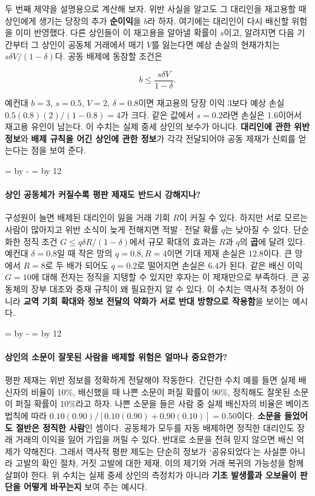 \documentclass[10pt,a4paper]{article}
\newcommand{\ReserveQuestionSpace}{%
  \par\begingroup
  \dimen0=\pagegoal \advance\dimen0 by -\pagetotal
  \dimen2=\baselineskip \multiply\dimen2 by 12
  \ifdim\dimen0<\dimen2 \newpage\fi
  \endgroup}
\begin{document}
두 번째 제약을 설명용으로 계산해 보자. 위반 사실을 알고도 그 대리인을 재고용할 때 상인에게 생기는 당장의 추가 \textbf{순이익}을 $b$라 하자. 여기에는 대리인이 다시 배신할 위험을 이미 반영했다. 다른 상인들이 이 재고용을 알아낼 확률이 $s$이고, 알려지면 다음 기간부터 그 상인이 공동체 거래에서 매기 $V$를 잃는다면 예상 손실의 현재가치는 $s\delta V/(1-\delta)$다. 공동 배제에 동참할 조건은\par

\[
b\leq\frac{s\delta V}{1-\delta}.
\]

예컨대 $b=3$, $s=0.5$, $V=2$, $\delta=0.8$이면 재고용의 당장 이익 3보다 예상 손실 $0.5(0.8)(2)/(1-0.8)=4$가 크다. 같은 값에서 $s=0.2$라면 손실은 1.6이어서 재고용 유인이 남는다. 이 수치는 실제 중세 상인의 보수가 아니다. \textbf{대리인에 관한 위반 정보}와 \textbf{배제 규칙을 어긴 상인에 관한 정보}가 각각 전달되어야 공동 제재가 신뢰를 얻는다는 점을 보여 준다.\par

\ReserveQuestionSpace
\paragraph{상인 공동체가 커질수록 평판 제재도 반드시 강해지나?}
구성원이 늘면 배제된 대리인이 잃을 거래 기회 $R$이 커질 수 있다. 하지만 서로 모르는 사람이 많아지고 위반 소식이 늦게 전해지면 적발·전달 확률 $q$는 낮아질 수 있다. 단순화한 정직 조건 $G\leq q\delta R/(1-\delta)$에서 규모 확대의 효과는 $R$과 $q$의 \textbf{곱}에 달려 있다. 예컨대 $\delta=0.8$일 때 작은 망의 $q=0.8,R=4$이면 기대 제재 손실은 $12.8$이다. 큰 망에서 $R=8$로 두 배가 되어도 $q=0.2$로 떨어지면 손실은 $6.4$가 된다. 같은 배신 이익 $G=10$에 대해 전자는 정직을 지탱할 수 있지만 후자는 이 제재만으로 부족하다. 큰 공동체의 장부 대조와 중재 규칙이 왜 필요한지 알 수 있다. 이 수치는 역사적 추정이 아니라 \textbf{교역 기회 확대와 정보 전달의 약화가 서로 반대 방향으로 작용함}을 보이는 예시다.\par

\ReserveQuestionSpace
\paragraph{상인의 소문이 잘못된 사람을 배제할 위험은 얼마나 중요한가?}
평판 제재는 위반 정보를 정확하게 전달해야 작동한다. 간단한 수치 예를 들면 실제 배신자의 비율이 10\%, 배신했을 때 나쁜 소문이 퍼질 확률이 90\%, 정직해도 잘못된 소문이 퍼질 확률이 10\%라고 하자. 나쁜 소문을 들은 사람 중 실제 배신자의 비율은 베이즈 법칙에 따라 $0.10(0.90)/[0.10(0.90)+0.90(0.10)]=0.50$이다. \textbf{소문을 들었어도 절반은 정직한 사람}인 셈이다. 공동체가 모두를 자동 배제하면 정직한 대리인도 장래 거래의 이익을 잃어 가입을 꺼릴 수 있다. 반대로 소문을 전혀 믿지 않으면 배신 억제가 약해진다. 그래서 역사적 평판 제도는 단순히 정보가 ‘공유되었다’는 사실뿐 아니라 고발의 확인 절차, 거짓 고발에 대한 제재, 이의 제기와 거래 복귀의 가능성을 함께 살펴야 한다. 위 수치는 실제 중세 상인의 측정치가 아니라 \textbf{기초 발생률과 오보율이 판단을 어떻게 바꾸는지} 보여 주는 예시다.\par
\end{document}
